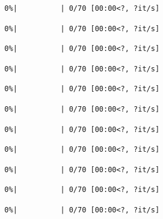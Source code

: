 \documentclass[
  english,
  letterpaper,
]{scrbook}
\begin{document}
\protect{}\label{team4-train-3}
\begin{verbatim}
  0%|          | 0/70 [00:00<?, ?it/s]
\end{verbatim}

\protect{}\label{team4-train-4}
\begin{verbatim}
  0%|          | 0/70 [00:00<?, ?it/s]
\end{verbatim}

\protect{}\label{team4-train-5}
\begin{verbatim}
  0%|          | 0/70 [00:00<?, ?it/s]
\end{verbatim}

\protect{}\label{team4-train-6}
\begin{verbatim}
  0%|          | 0/70 [00:00<?, ?it/s]
\end{verbatim}

\protect{}\label{team4-train-7}
\begin{verbatim}
  0%|          | 0/70 [00:00<?, ?it/s]
\end{verbatim}

\protect{}\label{team4-train-8}
\begin{verbatim}
  0%|          | 0/70 [00:00<?, ?it/s]
\end{verbatim}

\protect{}\label{team4-train-9}
\begin{verbatim}
  0%|          | 0/70 [00:00<?, ?it/s]
\end{verbatim}

\protect{}\label{team4-train-10}
\begin{verbatim}
  0%|          | 0/70 [00:00<?, ?it/s]
\end{verbatim}

\protect{}\label{team4-train-11}
\begin{verbatim}
  0%|          | 0/70 [00:00<?, ?it/s]
\end{verbatim}

\protect{}\label{team4-train-12}
\begin{verbatim}
  0%|          | 0/70 [00:00<?, ?it/s]
\end{verbatim}

\protect{}\label{team4-train-13}
\begin{verbatim}
  0%|          | 0/70 [00:00<?, ?it/s]
\end{verbatim}
\end{document}
